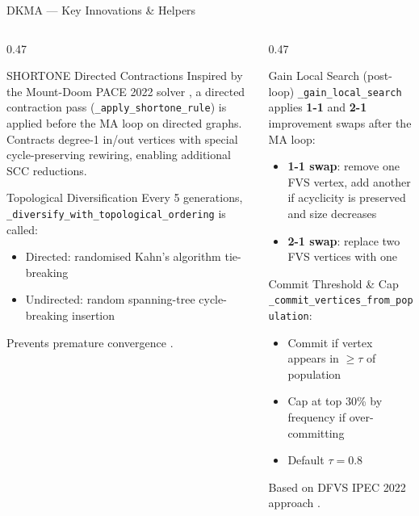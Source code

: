 \documentclass[aspectratio=169,10pt]{beamer}
\begin{document}
\begin{frame}{DKMA — Key Innovations \& Helpers}
  \begin{columns}[T]
    \begin{column}{0.47\textwidth}
      \begin{block}{SHORTONE Directed Contractions}
        Inspired by the Mount-Doom PACE 2022 solver \cite{langedal2022},
        a directed contraction pass (\texttt{\_apply\_shortone\_rule})
        is applied before the MA loop on directed graphs.\\[3pt]
        Contracts degree-1 in/out vertices with special cycle-preserving rewiring,
        enabling additional SCC reductions.
      \end{block}
      \vspace{4pt}
      \begin{block}{Topological Diversification}
        Every 5 generations, \texttt{\_diversify\_with\_topological\_ordering}
        is called:\\
        \begin{itemize}
          \item Directed: randomised Kahn's algorithm tie-breaking
          \item Undirected: random spanning-tree cycle-breaking insertion
        \end{itemize}
        Prevents premature convergence \cite{lust2010}.
      \end{block}
    \end{column}
    \begin{column}{0.47\textwidth}
      \begin{block}{Gain Local Search (post-loop)}
        \texttt{\_gain\_local\_search} applies \textbf{1-1} and \textbf{2-1}
        improvement swaps after the MA loop:
        \begin{itemize}
          \item \textbf{1-1 swap}: remove one FVS vertex, add another
            if acyclicity is preserved and size decreases
          \item \textbf{2-1 swap}: replace two FVS vertices with one
        \end{itemize}
      \end{block}
      \vspace{4pt}
      \begin{block}{Commit Threshold \& Cap}
        \texttt{\_commit\_vertices\_from\_population}:
        \begin{itemize}
          \item Commit if vertex appears in $\ge \tau$ of population
          \item Cap at top 30\% by frequency if over-committing
          \item Default $\tau = 0.8$
        \end{itemize}
        Based on DFVS IPEC 2022 approach \cite{pace2022}.
      \end{block}
    \end{column}
  \end{columns}
\end{frame}
\end{document}

